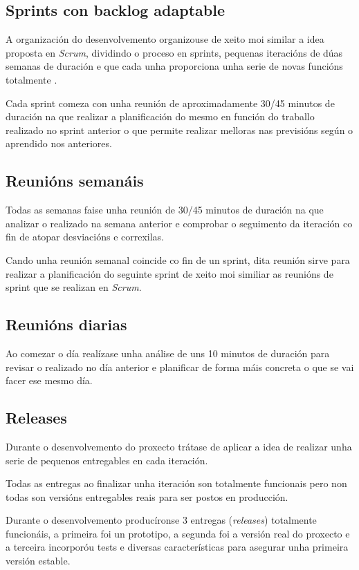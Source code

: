     \subsection{Sprints con backlog adaptable}
    A organización do desenvolvemento organizouse de xeito moi similar a idea 
proposta en \emph{Scrum}, dividindo o proceso en sprints, pequenas iteracións 
de dúas semanas de duración e que cada unha proporciona unha serie de novas 
funcións totalmente .

    Cada sprint comeza con unha reunión de aproximadamente 30/45 minutos de 
duración na que realizar a planificación do mesmo en función do 
traballo realizado no sprint anterior o que permite realizar melloras nas 
previsións según o aprendido nos anteriores.

    \subsection{Reunións semanáis}
    Todas as semanas faise unha reunión de 30/45 minutos de duración na que 
analizar o realizado na semana anterior e comprobar o seguimento da iteración 
co fin de atopar desviacións e correxilas.

    Cando unha reunión semanal coincide co fin de un sprint, dita reunión 
sirve para realizar a planificación do seguinte sprint de xeito moi similiar as 
reunións de sprint que se realizan en \emph{Scrum}.

    \subsection{Reunións diarias}
    Ao comezar o día realízase unha análise de uns 10 minutos de duración para 
revisar o realizado no día anterior e planificar de forma máis concreta o que 
se vai facer ese mesmo día.

    \subsection{Releases}
    Durante o desenvolvemento do proxecto trátase de aplicar a idea de realizar 
unha serie de pequenos entregables en cada iteración.
    
    Todas as entregas ao finalizar unha iteración son totalmente funcionais 
pero non todas son versións entregables reais para ser postos en producción.

    Durante o desenvolvemento producíronse 3 entregas (\emph{releases}) 
totalmente funcionáis, a primeira foi un prototipo, a segunda foi a versión 
real do proxecto e a terceira incorporóu tests e diversas características para 
asegurar unha primeira versión estable.

